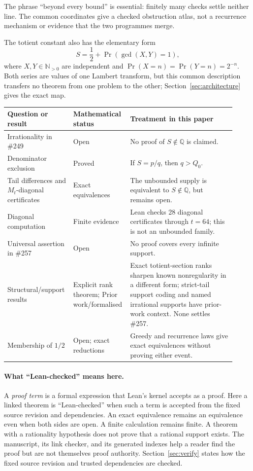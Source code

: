 \documentclass[11pt]{article}
\theoremstyle{definition}
\theoremstyle{remark}
\newcommand{\Npos}{\mathbb{N}_{>0}}
\newcommand{\Q}{\mathbb{Q}}
\newcommand{\Qzero}{Q_0}
\begin{document}
The phrase ``beyond every bound'' is essential: finitely many checks settle
neither line.  The common coordinates give a checked obstruction atlas, not a
recurrence mechanism or evidence that the two programmes merge.

The totient constant also has the elementary form
\[
 S=\frac12+\Pr(\gcd(X,Y)=1),
\]
where \(X,Y\in\Npos\) are independent and
\(\Pr(X=n)=\Pr(Y=n)=2^{-n}\).  Both series are values of one Lambert
transform, but this common description transfers no theorem from one problem
to the other; Section~\ref{sec:architecture} gives the exact map.

\begin{table}[t]
\centering
\small
\begin{tabular}{@{}
  >{\raggedright\arraybackslash}p{0.27\linewidth}
  >{\raggedright\arraybackslash}p{0.20\linewidth}
  >{\raggedright\arraybackslash}p{0.45\linewidth}@{}}
\toprule
Question or result & Mathematical status & Treatment in this paper \\
\midrule
Irrationality in \#249 & Open & No proof of \(S\notin\Q\) is claimed. \\
Denominator exclusion & Proved & If \(S=p/q\), then \(q>\Qzero\). \\
Tail differences and \(M_t\)-diagonal certificates & Exact equivalences & The unbounded supply is equivalent to \(S\notin\Q\), but remains open. \\
Diagonal computation & Finite evidence & Lean checks 28 diagonal certificates through \(t=64\); this is not an unbounded family. \\
Universal assertion in \#257 & Open & No proof covers every infinite support. \\
Structural/support results & Explicit rank theorem; Prior work/formalised & Exact totient-section ranks sharpen known nonregularity in a different form; strict-tail support coding and named irrational supports have prior-work context.  None settles \#257. \\
Membership of \(1/2\) & Open; exact reductions & Greedy and recurrence laws give exact equivalences without proving either event. \\
\bottomrule
\end{tabular}
\end{table}

\paragraph{What ``Lean-checked'' means here.}
A \emph{proof term} is a formal expression that Lean's kernel accepts as a
proof.  Here a linked theorem is ``Lean-checked'' when such a term is accepted
from the fixed source revision and dependencies.  An exact equivalence remains
an equivalence even when both sides are open.  A finite calculation remains
finite.  A theorem with a rationality hypothesis does not prove that a rational
support exists.
The manuscript, its link checker, and its generated indexes help a reader find
the proof but are not themselves proof authority.  Section~\ref{sec:verify}
states how the fixed source revision and trusted dependencies are checked.
\end{document}
